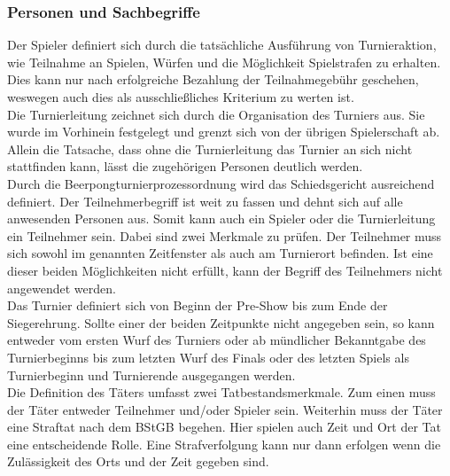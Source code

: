 \documentclass[a5paper, 12pt]{article}
\begin{document}
\subsubsection{Personen und Sachbegriffe}
Der Spieler definiert sich durch die tatsächliche Ausführung von Turnieraktion, wie Teilnahme an Spielen, Würfen und die Möglichkeit Spielstrafen zu erhalten. Dies kann nur nach erfolgreiche Bezahlung der Teilnahmegebühr geschehen, weswegen auch dies als ausschließliches Kriterium zu werten ist.\\
Die Turnierleitung zeichnet sich durch die Organisation des Turniers aus. Sie wurde im Vorhinein festgelegt und grenzt sich von der übrigen Spielerschaft ab. Allein die Tatsache, dass ohne die Turnierleitung das Turnier an sich nicht stattfinden kann, lässt die zugehörigen Personen deutlich werden. \\
Durch die Beerpongturnierprozessordnung wird das Schiedsgericht ausreichend definiert.
Der Teilnehmerbegriff ist weit zu fassen und dehnt sich auf alle anwesenden Personen aus. Somit kann auch ein Spieler oder die Turnierleitung ein Teilnehmer sein. Dabei sind zwei Merkmale zu prüfen. Der Teilnehmer muss sich sowohl im genannten Zeitfenster als auch am Turnierort befinden. Ist eine dieser beiden Möglichkeiten nicht erfüllt, kann der Begriff des Teilnehmers nicht angewendet werden.\\
Das Turnier definiert sich von Beginn der Pre-Show bis zum Ende der Siegerehrung. Sollte einer der beiden Zeitpunkte nicht angegeben sein, so kann entweder vom ersten Wurf des Turniers oder ab mündlicher Bekanntgabe des Turnierbeginns bis zum letzten Wurf des Finals oder des letzten Spiels als Turnierbeginn und Turnierende ausgegangen werden.\\
Die Definition des Täters umfasst zwei Tatbestandsmerkmale. Zum einen muss der Täter entweder Teilnehmer und/oder Spieler sein. Weiterhin muss der Täter eine Straftat nach dem BStGB begehen. Hier spielen auch Zeit und Ort der Tat eine entscheidende Rolle. Eine Strafverfolgung kann nur dann erfolgen wenn die Zulässigkeit des Orts und der Zeit gegeben sind.\\
\end{document}
